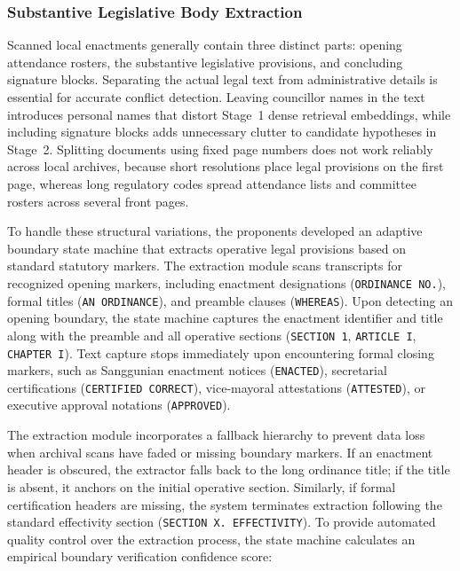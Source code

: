         \subsubsection{Substantive Legislative Body Extraction}
        \label{sec:local_substantive_extraction}
        Scanned local enactments generally contain three distinct parts: opening attendance rosters, the substantive legislative provisions, and concluding signature blocks. Separating the actual legal text from administrative details is essential for accurate conflict detection. Leaving councillor names in the text introduces personal names that distort Stage~1 dense retrieval embeddings, while including signature blocks adds unnecessary clutter to candidate hypotheses in Stage~2. Splitting documents using fixed page numbers does not work reliably across local archives, because short resolutions place legal provisions on the first page, whereas long regulatory codes spread attendance lists and committee rosters across several front pages.

        To handle these structural variations, the proponents developed an adaptive boundary state machine that extracts operative legal provisions based on standard statutory markers. The extraction module scans transcripts for recognized opening markers, including enactment designations (\texttt{ORDINANCE NO.}), formal titles (\texttt{AN ORDINANCE}), and preamble clauses (\texttt{WHEREAS}). Upon detecting an opening boundary, the state machine captures the enactment identifier and title along with the preamble and all operative sections (\texttt{SECTION 1}, \texttt{ARTICLE I}, \texttt{CHAPTER I}). Text capture stops immediately upon encountering formal closing markers, such as Sanggunian enactment notices (\texttt{ENACTED}), secretarial certifications (\texttt{CERTIFIED CORRECT}), vice-mayoral attestations (\texttt{ATTESTED}), or executive approval notations (\texttt{APPROVED}).

        The extraction module incorporates a fallback hierarchy to prevent data loss when archival scans have faded or missing boundary markers. If an enactment header is obscured, the extractor falls back to the long ordinance title; if the title is absent, it anchors on the initial operative section. Similarly, if formal certification headers are missing, the system terminates extraction following the standard effectivity section (\texttt{SECTION X. EFFECTIVITY}). To provide automated quality control over the extraction process, the state machine calculates an empirical boundary verification confidence score:

